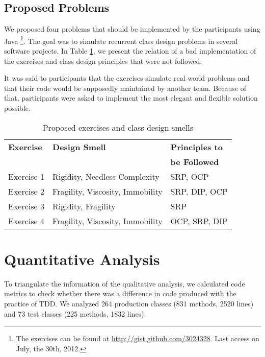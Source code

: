 \documentclass[conference]{IEEEtran}
\begin{document}
\subsection{Proposed Problems}
\label{sec:exercicios}

We proposed four problems that should be implemented by the participants using Java
\footnote{The exercises can be found at \url{http://gist.github.com/3024328}. Last access on July, the 30th, 2012.}. 
The goal was to simulate recurrent class design problems in several software projects.
In Table \ref{tab:problemas-exercicios}, we present the relation of a bad implementation of
the exercises and class design principles that were not followed.

It was said to participants that the exercises simulate real world problems and that their code
would be supposedly maintained by another team. Because of that, participants were asked to
implement the most elegant and flexible solution possible.

\begin{table}
	\centering
	\begin{tabular}{| l | l | l | }
		\hline
		\textbf{Exercise} & \textbf{Design Smell} & \textbf{Principles to}\\
		& & \textbf{be Followed}\\
		
		\hline
		
		Exercise 1 & Rigidity, Needless Complexity & SRP, OCP \\
		Exercise 2 & Fragility, Viscosity, Immobility & SRP, DIP, OCP \\
		Exercise 3 & Rigidity, Fragility & SRP\\
		Exercise 4 & Fragility, Viscosity, Immobility & OCP, SRP, DIP \\
		
		\hline
	\end{tabular}
	\caption{Proposed exercises and class design smells}
	\label{tab:problemas-exercicios}
\end{table}

\section{Quantitative Analysis}

To triangulate the information of the qualitative analysis, we calculated
code metrics to check whether there was a difference in code produced
with the practice of TDD.
We analyzed
264 production classes (831 methods, 2520 lines) and
73 test classes (225 methods, 1832 lines).
\end{document}
